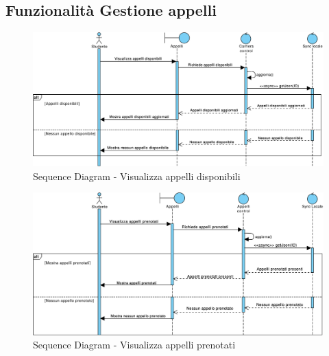 \subsection{Funzionalità Gestione appelli}
\clearpage
\begin{figure} 
	\centering
	\includegraphics[width=6.5in]{imgs/gruppo1/sequence_diagrams/SD6_visualizza_appelli_disponibili.pdf}
	\caption{Sequence Diagram - Visualizza appelli disponibili}
	\label{diag:visualizzaAppelliDisponibiliSD}
\end{figure}

\begin{figure}
	\centering
	\includegraphics[width=6.5in]{imgs/gruppo1/sequence_diagrams/SD7_visualizza_appelli_prenotati.pdf}
	\caption{Sequence Diagram - Visualizza appelli prenotati}
	\label{diag:visualizzaAppelliPrenotatiSD}
\end{figure}

